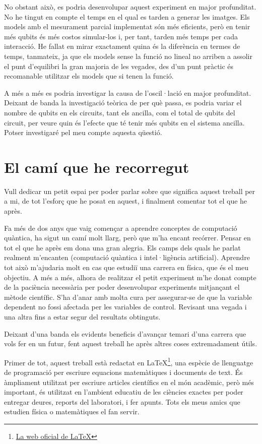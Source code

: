 No obstant això, es podria desenvolupar aquest experiment en major profunditat. No he tingut en compte el temps en el qual es tarden a generar les imatges. Els models amb el mesurament parcial implementat són més eficients, però en tenir més qubits és més costos simular-los i, per tant, tarden més temps per cada interacció. He fallat en mirar exactament quina és la diferència en termes de temps, tanmateix, ja que els models sense la funció no lineal no arriben a assolir el punt d'equilibri la gran majoria de les vegades, des d'un punt pràctic és recomanable utilitzar els models que si tenen la funció. 

A més a més es podria investigar la causa de l'oscil·lació en major profunditat. Deixant de banda la investigació teòrica de per què passa, es podria variar el nombre de qubits en els circuits, tant els ancilla, com el total de qubits del circuit, per veure quin és l'efecte que té tenir més qubits en el sistema ancilla. Potser investigaré pel meu compte aquesta qüestió. 

\section*{El camí que he recorregut}
Vull dedicar un petit espai per poder parlar sobre que significa aquest treball per a mi, de tot l'esforç que he posat en aquest, i finalment comentar tot el que he après.

Fa més de dos anys que vaig començar a aprendre conceptes de computació quàntica, ha sigut un camí molt llarg, però que m'ha encant recórrer. Pensar en tot el que he après em dona una gran alegria. Els camps dels quals he parlat realment m'encanten (computació quàntica i intel·ligència artificial). Aprendre tot això m'ajudaria molt en cas que estudiï una carrera en física, que és el meu objectiu. A més a més, alhora de realitzar el petit experiment m'he donat compte de la paciència necessària per poder desenvolupar experiments mitjançant el mètode científic. S'ha d'anar amb molta cura per assegurar-se de que la variable dependent no fossi afectada per les variables de control. Revisant una vegada i una altra fins a estar segur del resultats obtinguts. 

Deixant d'una banda els evidents beneficis d'avançar temari d'una carrera que vols fer en un futur, fent aquest treball he après altres coses extremadament útils.

Primer de tot, aquest treball està redactat en \LaTeX\footnote{\href{https://www.latex-project.org/}{La web oficial de \LaTeX}}, una espècie de llenguatge de programació per escriure equacions matemàtiques i documents de text. És àmpliament utilitzat per escriure articles científics en el món acadèmic, però més important, és utilitzat en l'ambient educatiu de les ciències exactes per poder entregar deures, reports del laboratori, i fer apunts. Tots els meus amics que estudien física o matemàtiques el fan servir.

